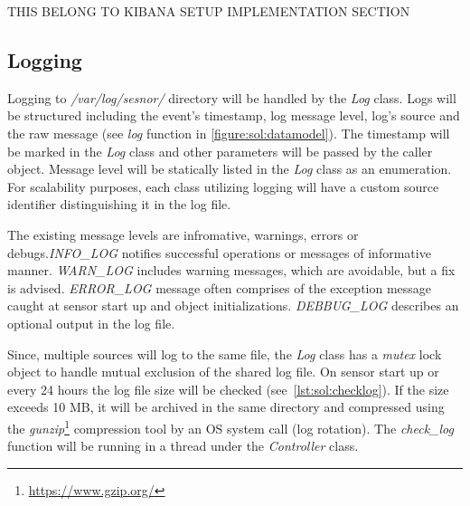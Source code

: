 \documentclass[12pt,a4paper,twoside]{report}
\begin{document}
			THIS BELONG TO KIBANA SETUP IMPLEMENTATION SECTION
						
			
		\subsection{Logging} \label{implementation:sensor:logging}
			Logging to \emph{/var/log/sesnor/} directory will be handled by the \emph{Log} class. Logs will be structured including the event's timestamp, log message level, log's source and the raw message (see \emph{log} function in \autoref{figure:sol:datamodel}). The timestamp will be marked in the \emph{Log} class and other parameters will be passed by the caller object. Message level will be statically listed in the \emph{Log} class as an enumeration. For scalability purposes, each class utilizing logging will have a custom source identifier distinguishing it in the log file.\par				
			The existing message levels are infromative, warnings, errors or debugs.\emph{INFO\_LOG} notifies successful operations or messages of informative manner. \emph{WARN\_LOG} includes warning messages, which are avoidable, but a fix is advised. \emph{ERROR\_LOG} message often comprises of the exception message caught at sensor start up and object initializations. \emph{DEBBUG\_LOG} describes an optional output in the log file.\par
			Since, multiple sources will log to the same file, the \emph{Log} class has a \emph{mutex} lock object to handle mutual exclusion of the shared log file. On sensor start up or every 24 hours the log file size will be checked (see~\autoref{lst:sol:checklog}). If the size exceeds 10 MB, it will be archived in the same directory and compressed using the \emph{gunzip}\footnote{\url{https://www.gzip.org/}} compression tool by an OS system call (log rotation). The \emph{check\_log} function will be running in a thread under the \emph{Controller} class.
			
	

\newpage


\end{document}
